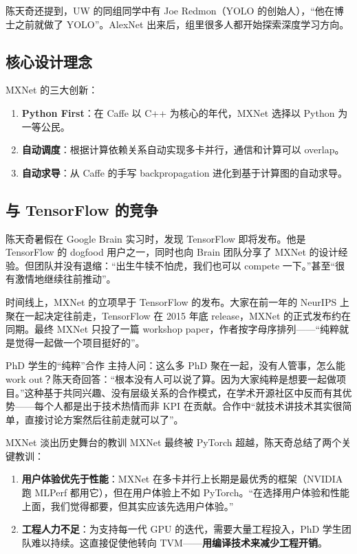 \documentclass[a4paper]{article}
\begin{document}
陈天奇还提到，UW 的同组同学中有 Joe Redmon（YOLO 的创始人），``他在博士之前就做了 YOLO''。AlexNet 出来后，组里很多人都开始探索深度学习方向。

\subsection{核心设计理念}

MXNet 的三大创新：
\begin{enumerate}
    \item \textbf{Python First}：在 Caffe 以 C++ 为核心的年代，MXNet 选择以 Python 为一等公民。
    \item \textbf{自动调度}：根据计算依赖关系自动实现多卡并行，通信和计算可以 overlap。
    \item \textbf{自动求导}：从 Caffe 的手写 backpropagation 进化到基于计算图的自动求导。
\end{enumerate}

\subsection{与 TensorFlow 的竞争}

陈天奇暑假在 Google Brain 实习时，发现 TensorFlow 即将发布。他是 TensorFlow 的 dogfood 用户之一，同时也向 Brain 团队分享了 MXNet 的设计经验。但团队并没有退缩：``出生牛犊不怕虎，我们也可以 compete 一下。''甚至``很有激情地继续往前推动''。

时间线上，MXNet 的立项早于 TensorFlow 的发布。大家在前一年的 NeurIPS 上聚在一起决定往前走，TensorFlow 在 2015 年底 release，MXNet 的正式发布约在同期。最终 MXNet 只投了一篇 workshop paper，作者按字母序排列------``纯粹就是觉得一起做一个项目挺好的''。

\begin{knowledgebox}{PhD 学生的``纯粹''合作}
主持人问：这么多 PhD 聚在一起，没有人管事，怎么能 work out？陈天奇回答：``根本没有人可以说了算。因为大家纯粹是想要一起做项目。''这种基于共同兴趣、没有层级关系的合作模式，在学术开源社区中反而有其优势------每个人都是出于技术热情而非 KPI 在贡献。合作中``就技术讲技术其实很简单，直接讨论方案然后往前走就可以了''。
\end{knowledgebox}

\begin{warningbox}{MXNet 淡出历史舞台的教训}
MXNet 最终被 PyTorch 超越，陈天奇总结了两个关键教训：
\begin{enumerate}
    \item \textbf{用户体验优先于性能}：MXNet 在多卡并行上长期是最优秀的框架（NVIDIA 跑 MLPerf 都用它），但在用户体验上不如 PyTorch。``在选择用户体验和性能上面，我们觉得都要，但其实应该先选用户体验。''
    \item \textbf{工程人力不足}：为支持每一代 GPU 的迭代，需要大量工程投入，PhD 学生团队难以持续。这直接促使他转向 TVM------\textbf{用编译技术来减少工程开销}。
\end{enumerate}
\end{warningbox}
\end{document}
